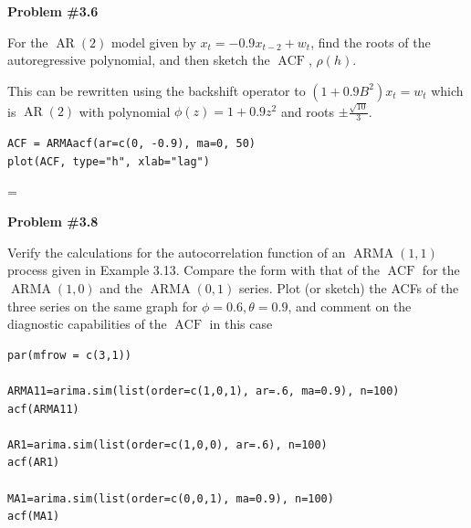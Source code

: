\documentclass[12pt]{article}
\makeatletter
\newcommand*\notab[1]{%
  \begingroup   %
    \par        %
    \@totalleftmargin=0pt \linewidth=\columnwidth
    \parshape 0
    #1\par      %
  \endgroup
}
\def\ARMA{\operatorname{ARMA}}
\def\ACF{\operatorname{ACF}}
\newcommand{\nl}{\vspace{0.1in}\noindent}
\makeatother
\begin{document}
\vspace{2in}
\noindent \textbf{Problem \#3.6}

\noindent For the $\operatorname{AR}(2)$ model given by $x_t = -0.9x_{t-2} + w_t$, find the roots of the
autoregressive polynomial, and then sketch the $\operatorname{ACF}$, $\rho(h)$.

\soln* 

\nl This can be rewritten using the backshift operator to $(1+0.9B^2)x_t = w_t$ which is
 $\operatorname{AR}(2)$ with polynomial $\phi(z) = 1+0.9z^2$ and roots $\pm \frac{\sqrt{10}}{3}$.

\nl \texttt{ACF = ARMAacf(ar=c(0, -0.9), ma=0, 50)}
\\ \texttt{plot(ACF, type="h", xlab="lag")}

\notab{}

\newpage
\noindent \textbf{Problem \#3.8}

\noindent Verify the calculations for the autocorrelation function of an $\ARMA(1, 1)$
process given in Example 3.13. Compare the form with that of the $\ACF$ for
the $\ARMA(1, 0)$ and the $\ARMA(0, 1)$ series. Plot (or sketch) the ACFs of
the three series on the same graph for $\phi = 0.6, \theta =0.9$, and comment on the
diagnostic capabilities of the $\ACF$ in this case

\noindent \soln

\nl \begin{verbatim}
par(mfrow = c(3,1))

ARMA11=arima.sim(list(order=c(1,0,1), ar=.6, ma=0.9), n=100)
acf(ARMA11)

AR1=arima.sim(list(order=c(1,0,0), ar=.6), n=100)
acf(AR1)

MA1=arima.sim(list(order=c(0,0,1), ma=0.9), n=100)
acf(MA1)
\end{verbatim}
\end{document}

